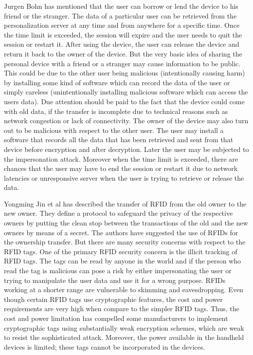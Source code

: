 \documentclass[letterpaper]{article}
\begin{document}
Jurgen Bohn \cite{2} has mentioned that the user can borrow or lend the device to his friend or the stranger. The data of a particular user can be retrieved from the personalization server at any time and from anywhere for a specific time. Once the time limit is exceeded, the session will expire and the user needs to quit the session or restart it. After using the device, the user can release the device and return it back to the owner of the device. But the very basic idea of sharing the personal device with a friend or a stranger may cause information to be public. This could be due to the other user being malicious (intentionally causing harm) by installing some kind of software which can record the data of the user or simply careless (unintentionally installing malicious software which can access the users data). Due attention should be paid to the fact that the device could come with old data, if the transfer is incomplete due to technical reasons such as network congestion or lack of connectivity. The owner of the device may also turn out to be malicious with respect to the other user. The user may install a software that records all the data that has been retrieved and sent from that device before encryption and after decryption. Later the user may be subjected to the impersonation attack. Moreover when the time limit is exceeded, there are chances that the user may have to end the session or restart it due to network latencies or unresponsive server when the user is trying to retrieve or release the data.
\par
Yongming Jin et al \cite{3} has described the transfer of RFID from the old owner to the new owner. They define a protocol to safeguard the privacy of the respective owners by putting the clean stop between the transactions of the old and the new owners by means of a secret. The authors have suggested the use of RFIDs for the ownership transfer. But there are many security concerns with respect to the RFID tags. One of the primary RFID security concern is the illicit tracking of RFID tags. The tags can be read by anyone in the world and if the person who read the tag is malicious can pose a risk by either impersonating the user or trying to manipulate the user data and use it for a wrong purpose. RFIDs working at a shorter range are vulnerable to skimming and eavesdropping. Even though certain RFID tags use cryptographic features, the cost and power requirements are very high when compare to the simpler RFID tags. Thus, the cost and power limitation has compelled some manufacturers to implement cryptographic tags using substantially weak encryption schemes, which are weak to resist the sophisticated attack. Moreover, the power available in the handheld devices is limited; these tags cannot be incorporated in the devices.
\end{document}
